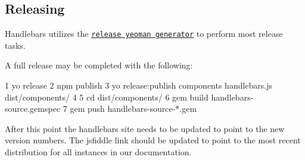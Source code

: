 \subsection*{Releasing}

Handlebars utilizes the \href{https://github.com/walmartlabs/generator-release}{\tt release yeoman generator} to perform most release tasks.

A full release may be completed with the following\+:


\begin{DoxyCode}
1 yo release
2 npm publish
3 yo release:publish components handlebars.js dist/components/
4 
5 cd dist/components/
6 gem build handlebars-source.gemspec
7 gem push handlebars-source-*.gem
\end{DoxyCode}


After this point the handlebars site needs to be updated to point to the new version numbers. The jsfiddle link should be updated to point to the most recent distribution for all instances in our documentation. 